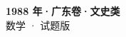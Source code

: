 \documentclass[zihao=-4, a4paper]{ctexart}
\begin{document}
\begin{center}
  {\Large\bfseries 1988 年·广东卷·文史类}\\[4pt]
  {\large 数学 · 试题版}
\end{center}
\medskip
{}

\end{document}
